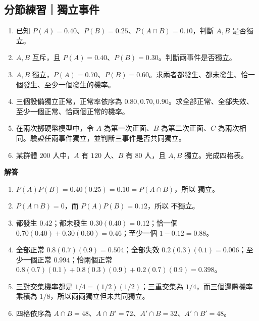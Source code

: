 \documentclass[11pt,a4paper]{article}
\providecommand{\tightlist}{%
  \setlength{\itemsep}{0pt}\setlength{\parskip}{0pt}}
\begin{document}
\begin{HandoutSelfCheck}

\subsection{分節練習｜獨立事件}\label{ux5206ux7bc0ux7df4ux7fd2ux7368ux7acbux4e8bux4ef6}

\begin{enumerate}
\def\labelenumi{\arabic{enumi}.}
\tightlist
\item
  已知 \(P(A)=0.40\)、\(P(B)=0.25\)、\(P(A\cap B)=0.10\)，判斷 \(A,B\) 是否獨立。
\item
  \(A,B\) 互斥，且 \(P(A)=0.40\)、\(P(B)=0.30\)。判斷兩事件是否獨立。
\item
  \(A,B\) 獨立，\(P(A)=0.70\)、\(P(B)=0.60\)。求兩者都發生、都未發生、恰一個發生、至少一個發生的機率。
\item
  三個設備獨立正常，正常率依序為 \(0.80,0.70,0.90\)。求全部正常、全部失效、至少一個正常、恰兩個正常的機率。
\item
  在兩次擲硬幣模型中，令 \(A\) 為第一次正面、\(B\) 為第二次正面、\(C\) 為兩次相同。驗證任兩事件獨立，並判斷三事件是否共同獨立。
\item
  某群體 \(200\) 人中，\(A\) 有 \(120\) 人、\(B\) 有 \(80\) 人，且 \(A,B\) 獨立。完成四格表。
\end{enumerate}

\textbf{解答}

\begin{enumerate}
\def\labelenumi{\arabic{enumi}.}
\tightlist
\item
  \(P(A)P(B)=0.40(0.25)=0.10=P(A\cap B)\)，所以 \(\boxed{\text{獨立}}\)。
\item
  \(P(A\cap B)=0\)，而 \(P(A)P(B)=0.12\)，所以 \(\boxed{\text{不獨立}}\)。
\item
  都發生 \(\boxed{0.42}\)；都未發生 \(0.30(0.40)=\boxed{0.12}\)；恰一個 \(0.70(0.40)+0.30(0.60)=\boxed{0.46}\)；至少一個 \(1-0.12=\boxed{0.88}\)。
\item
  全部正常 \(0.8(0.7)(0.9)=\boxed{0.504}\)；全部失效 \(0.2(0.3)(0.1)=\boxed{0.006}\)；至少一個正常 \(\boxed{0.994}\)；恰兩個正常 \(0.8(0.7)(0.1)+0.8(0.3)(0.9)+0.2(0.7)(0.9)=\boxed{0.398}\)。
\item
  三對交集機率都是 \(1/4=(1/2)(1/2)\)；三重交集為 \(1/4\)，而三個邊際機率乘積為 \(1/8\)，所以兩兩獨立但未共同獨立。
\item
  四格依序為 \(A\cap B=48\)、\(A\cap B'=72\)、\(A'\cap B=32\)、\(A'\cap B'=48\)。
\end{enumerate}

\end{HandoutSelfCheck}
\end{document}

